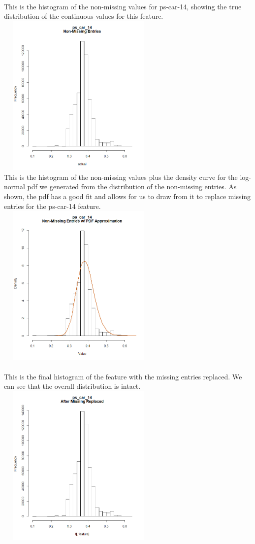 \documentclass[fleqn,10pt]{SelfArx} %
\begin{document}
\\
This is the histogram of the non-missing values for ps-car-14, showing the true distribution of the continuous values for this feature.\\ 
\includegraphics[width=8cm, height=8cm]{cont-actual} \\
\newpage
This is the histogram of the non-missing values plus the density curve for the log-normal pdf we generated from the distribution of the non-missing entries. As shown, the pdf has a good fit and allows for us to draw from it to replace missing entries for the ps-car-14 feature.\\ 
\includegraphics[width=8cm, height=8cm]{cont-pdf} \\
\\
This is the final histogram of the feature with the missing entries replaced. We can see that the overall distribution is intact.\\ 
\includegraphics[width=8cm, height=8cm]{cont-after} \\
\end{document}
